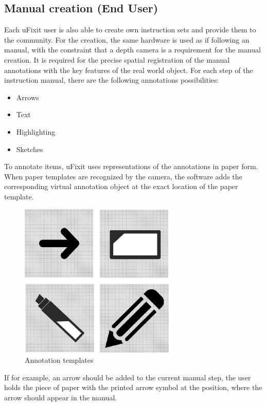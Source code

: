 \subsection{Manual creation (End User)}
Each uFixit user is also able to create own instruction sets and provide them to the community. For the creation, the same hardware is used as if following an manual, with the constraint that a depth camera is a requirement for the manual creation. It is required for the precise spatial registration of the manual annotations with the key features of the real world object. For each step of the instruction manual, there are the following annotations possibilities:

\begin{itemize}
\item Arrows
\item Text
\item Highlighting
\item Sketches
\end{itemize}

To annotate items, uFixit uses representations of the annotations in paper form. When paper templates are recognized by the camera, the software adds the corresponding virtual annotation object at the exact location of the paper template. 

\begin{figure}[H]
		\includegraphics[width=0.66\textwidth]{../images/paperMarker.png}
		\centering
		\caption{Annotation templates}
		\label{fig:cardBoard}
\end{figure}

If for example, an arrow should be added to the current manual step, the user holds the piece of paper with the printed arrow symbol at the position, where the arrow should appear in the manual. 

